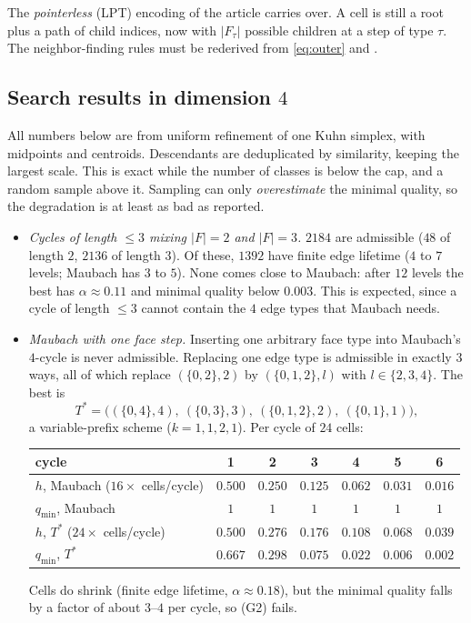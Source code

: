 \documentclass[11pt]{article}
\theoremstyle{plain}
\theoremstyle{definition}
\theoremstyle{remark}
\begin{document}
The \emph{pointerless} (LPT) encoding of the article carries over. A cell
is still a root plus a path of child indices, now with $|F_\tau|$ possible
children at a step of type $\tau$. The neighbor-finding rules must be
rederived from \eqref{eq:outer} and .

\subsection{Search results in dimension $4$}

All numbers below are from uniform refinement of one Kuhn simplex, with
midpoints and centroids. Descendants are deduplicated by similarity,
keeping the largest scale. This is exact while the number of classes is
below the cap, and a random sample above it. Sampling can only
\emph{overestimate} the minimal quality, so the degradation is at least
as bad as reported.
\begin{itemize}
\item \emph{Cycles of length $\le3$ mixing $|F|=2$ and $|F|=3$.} $2184$ are
  admissible ($48$ of length $2$, $2136$ of length $3$). Of these, $1392$
  have finite edge lifetime ($4$ to $7$ levels; Maubach has $3$ to $5$).
  None comes close to Maubach: after $12$ levels the best has
  $\alpha\approx0.11$ and minimal quality below $0.003$. This is expected,
  since a cycle of length $\le3$ cannot contain the $4$ edge types that
  Maubach needs.
\item \emph{Maubach with one face step.} Inserting one arbitrary face type
  into Maubach's $4$-cycle is never admissible. Replacing one edge type is
  admissible in exactly $3$ ways, all of which replace $(\{0,2\},2)$ by
  $(\{0,1,2\},l)$ with $l\in\{2,3,4\}$. The best is
  \[
    T^\ast=\bigl((\{0,4\},4),\ (\{0,3\},3),\ (\{0,1,2\},2),\ (\{0,1\},1)\bigr),
  \]
  a variable-prefix scheme ($k=1,1,2,1$). Per cycle of $24$ cells:
  \begin{center}
  \begin{tabular}{@{}lcccccc@{}}
  \toprule
  cycle & 1 & 2 & 3 & 4 & 5 & 6\\
  \midrule
  $h$, Maubach ($16\times$ cells/cycle)   & $0.500$ & $0.250$ & $0.125$ & $0.062$ & $0.031$ & $0.016$\\
  $q_{\min}$, Maubach                     & $1$ & $1$ & $1$ & $1$ & $1$ & $1$\\
  $h$, $T^\ast$ ($24\times$ cells/cycle)  & $0.500$ & $0.276$ & $0.176$ & $0.108$ & $0.068$ & $0.039$\\
  $q_{\min}$, $T^\ast$                    & $0.667$ & $0.298$ & $0.075$ & $0.022$ & $0.006$ & $0.002$\\
  \bottomrule
  \end{tabular}
  \end{center}
  Cells do shrink (finite edge lifetime, $\alpha\approx0.18$), but the
  minimal quality falls by a factor of about $3$--$4$ per cycle, so (G2)
  fails.
\end{itemize}
\end{document}
